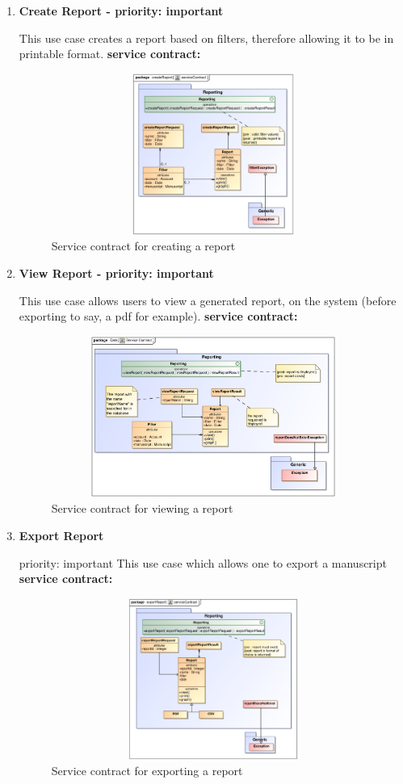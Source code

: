 \begin{enumerate}
\item \textbf{Create Report - priority: important}
\par{This use case creates  a report based on filters, therefore allowing it to be in printable format.}
\textbf{service contract:}

\begin{figure}[h]
\includegraphics[height=200px, width=500px]{epsImages/Reporting/createReport.eps}
\caption{Service contract for creating a report}
\end{figure}
\newpage
\item \textbf{View Report - priority: important}
\par{This use case allows users to view a generated report, on the system (before exporting to say, a pdf for example).}
\textbf{service contract:}

\begin{figure}[h]
\includegraphics[height=200px, width=500px]{epsImages/Reporting/viewReportServiceContract.eps}
\caption{Service contract for viewing a report}
\end{figure}

\item \textbf{Export Report}
\par{priority: important  This use case which allows one to export a manuscript}
\textbf{service contract:}

\begin{figure}[h]
\includegraphics[height=200px, width=500px]{epsImages/Reporting/exportReport.eps}
\caption{Service contract for exporting a report}
\end{figure}
\end{enumerate}

